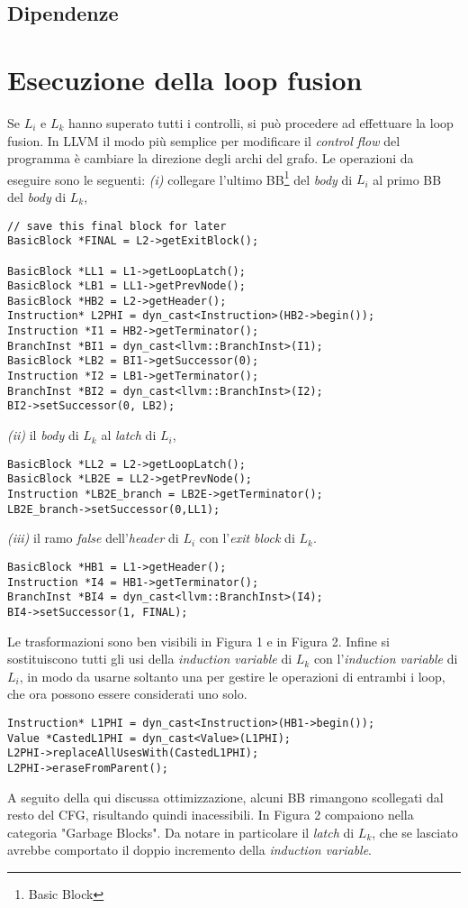 \documentclass[letterpaper, 11pt]{article}
\begin{document}
\begin{multicols}{2}
\subsection{Dipendenze}
\label{sec:org22ad388}
\section{Esecuzione della loop fusion}
\label{sec:org24525b4}
Se \(L_{i}\) e \(L_{k}\) hanno superato tutti i controlli, si può
procedere ad effettuare la loop fusion.
In LLVM il modo più semplice per modificare il \emph{control flow} del programma
è cambiare la direzione degli archi del grafo. Le operazioni da eseguire sono
le seguenti: \emph{(i)} collegare l'ultimo BB\footnote{Basic Block} del \emph{body} di \(L_{i}\) al
primo BB del \emph{body} di \(L_{k}\),
\footnotesize
\begin{verbatim}
// save this final block for later
BasicBlock *FINAL = L2->getExitBlock();

BasicBlock *LL1 = L1->getLoopLatch();
BasicBlock *LB1 = LL1->getPrevNode();
BasicBlock *HB2 = L2->getHeader();
Instruction* L2PHI = dyn_cast<Instruction>(HB2->begin());
Instruction *I1 = HB2->getTerminator();        
BranchInst *BI1 = dyn_cast<llvm::BranchInst>(I1);
BasicBlock *LB2 = BI1->getSuccessor(0);
Instruction *I2 = LB1->getTerminator();
BranchInst *BI2 = dyn_cast<llvm::BranchInst>(I2);
BI2->setSuccessor(0, LB2);
\end{verbatim}
\normalsize
 \emph{(ii)} il \emph{body} di \(L_{k}\) al \emph{latch} di \(L_{i}\),
\footnotesize
\begin{verbatim}
BasicBlock *LL2 = L2->getLoopLatch();
BasicBlock *LB2E = LL2->getPrevNode();
Instruction *LB2E_branch = LB2E->getTerminator();
LB2E_branch->setSuccessor(0,LL1);
\end{verbatim}
\normalsize
\emph{(iii)} il ramo \emph{false} dell'\emph{header} di \(L_{i}\) con l'\emph{exit block} di \(L_{k}\).
\footnotesize
\begin{verbatim}
BasicBlock *HB1 = L1->getHeader();
Instruction *I4 = HB1->getTerminator();
BranchInst *BI4 = dyn_cast<llvm::BranchInst>(I4);
BI4->setSuccessor(1, FINAL);
\end{verbatim}
\normalsize
Le trasformazioni sono ben visibili in Figura 1 e in Figura 2.
Infine si sostituiscono tutti gli usi della \emph{induction variable} di \(L_{k}\) con 
l'\emph{induction variable} di \(L_{i}\), in modo da usarne soltanto una per gestire le operazioni
di entrambi i loop, che ora possono essere considerati uno solo.
\newpage
\footnotesize
\begin{verbatim}
Instruction* L1PHI = dyn_cast<Instruction>(HB1->begin());
Value *CastedL1PHI = dyn_cast<Value>(L1PHI);
L2PHI->replaceAllUsesWith(CastedL1PHI);
L2PHI->eraseFromParent();
\end{verbatim}
\normalsize
A seguito della qui discussa ottimizzazione, alcuni BB rimangono scollegati dal resto del
CFG, risultando quindi inacessibili. In Figura 2 compaiono nella categoria "Garbage Blocks".
Da notare in particolare il \emph{latch} di \(L_{k}\), che se lasciato avrebbe comportato il
doppio incremento della \emph{induction variable}.
\newpage
\end{multicols}
\end{document}
